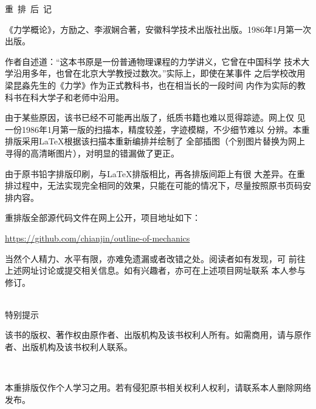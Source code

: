 \setcounter{page}{1}
\pagestyle{empty}
\begin{center}
  \xbsong 重~排~后~记
\end{center}
\vspace{1em}


《力学概论》，方励之、李淑娴合著，安徽科学技术出版社出版。1986年1月第一次出版。

作者自述道：“这本书原是一份普通物理课程的力学讲义，它曾在中国科学
技术大学沿用多年，也曾在北京大学教授过数次。”实际上，即使在某事件
之后学校改用梁昆淼先生的《力学》作为正式教科书，也在相当长的一段时间
内作为实际的教科书在科大学子和老师中沿用。

由于某些原因，该书已经不可能再出版了，纸质书籍也难以觅得踪迹。网上仅
见一份1986年1月第一版的扫描本，精度较差，字迹模糊，不少细节难以
分辨。本重排版采用\LaTeX 根据该扫描本重新编排并绘制了
全部插图（个别图片替换为网上寻得的高清晰图片），对明显的错漏做了更正。

由于原书铅字排版印刷，与\LaTeX 排版相比，再各排版间距上有很
大差异。在重排过程中，无法实现完全相同的效果，只能在可能的情况下，尽量按照原书页码安排内容。

重排版全部源代码文件在网上公开，项目地址如下：
\begin{center}
    \href{https://github.com/chianjin/outline-of-mechanics}{https://github.com/chianjin/outline-of-mechanics}
\end{center}

当然个人精力、水平有限，亦难免遗漏或者改错之处。阅读者如有发现，可
前往上述网址讨论或提交相关信息。如有兴趣者，亦可在上述项目网址联系
本人参与修订。

\clearpage

\heiti {}
\begin{center}
    ~\\
    特别提示
\end{center}
\normalsize
\vspace{1em}

该书的版权、著作权由原作者、出版机构及该书权利人所有。如需商用，请与原作者、出版机构及该书权利人联系。

~

本重排版仅作个人学习之用。若有侵犯原书相关权利人权利，请联系本人删除网络发布。
